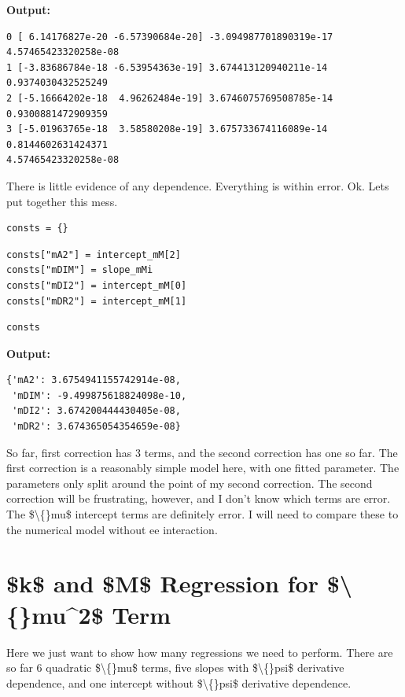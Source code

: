 \documentclass{article}
\begin{document}
\textbf{Output:}\begin{verbatim}
0 [ 6.14176827e-20 -6.57390684e-20] -3.094987701890319e-17 4.57465423320258e-08
1 [-3.83686784e-18 -6.53954363e-19] 3.674413120940211e-14 0.9374030432525249
2 [-5.16664202e-18  4.96262484e-19] 3.6746075769508785e-14 0.9300881472909359
3 [-5.01963765e-18  3.58580208e-19] 3.675733674116089e-14 0.8144602631424371
4.57465423320258e-08

\end{verbatim}

There is little evidence of any dependence. Everything is within error. Ok. Lets put together this mess.

\begin{lstlisting}
consts = {}\end{lstlisting}

\begin{lstlisting}
consts["mA2"] = intercept_mM[2]
consts["mDIM"] = slope_mMi
consts["mDI2"] = intercept_mM[0]
consts["mDR2"] = intercept_mM[1]\end{lstlisting}

\begin{lstlisting}
consts\end{lstlisting}

\textbf{Output:}\begin{verbatim}
{'mA2': 3.6754941155742914e-08,
 'mDIM': -9.499875618824098e-10,
 'mDI2': 3.674200444430405e-08,
 'mDR2': 3.674365054354659e-08}
\end{verbatim}

So far, first correction has 3 terms, and the second correction has one so far. The first correction is a reasonably simple model here, with one fitted parameter. The parameters only split around the point of my second correction. The second correction will be frustrating, however, and I don't know which terms are error. The \$\textbackslash\{\}mu\$ intercept terms are definitely error. I will need to compare these to the numerical model without ee interaction.

\section{\$k\$ and \$M\$ Regression for \$\textbackslash\{\}mu\textasciicircum{}2\$ Term}

Here we just want to show how many regressions we need to perform. There are so far 6 quadratic \$\textbackslash\{\}mu\$ terms, five slopes with \$\textbackslash\{\}psi\$ derivative dependence, and one intercept without \$\textbackslash\{\}psi\$ derivative dependence.
\end{document}
